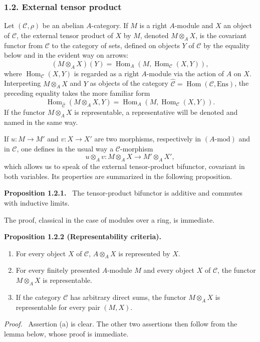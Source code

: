\documentclass[11pt]{article}
\newenvironment{statement}[1]{\par\medskip\noindent\textbf{#1.}\ }{\par\medskip}
\newenvironment{prooftext}[1][Proof]{\par\noindent\emph{#1.}\ }{\par\medskip}
\DeclareMathOperator{\Hom}{Hom}
\providecommand{\Hom}{\operatorname{Hom}}
\providecommand{\Ens}{\mathrm{Ens}}
\providecommand{\cC}{\mathcal C}
\providecommand{\Ens}{\operatorname{Ens}}
\begin{document}
\subsubsection*{1.2. External tensor product}
Let $(\cC,\rho)$ be an abelian $A$-category. If $M$ is a right $A$-module and $X$ an object of $\cC$, the external tensor product of $X$ by $M$, denoted $M\otimes_A X$, is the covariant functor from $\cC$ to the category of sets, defined on objects $Y$ of $\cC$ by the equality below and in the evident way on arrows:
\[
(M\otimes_A X)(Y)=\Hom_A(M,\Hom_{\cC}(X,Y)),
\]
where $\Hom_{\cC}(X,Y)$ is regarded as a right $A$-module via the action of $A$ on $X$. Interpreting $M\otimes_AX$ and $Y$ as objects of the category $\widehat{\cC}=\Hom(\cC,\Ens)$, the preceding equality takes the more familiar form
\[
\Hom_{\widehat{\cC}}(M\otimes_A X,Y)=\Hom_A(M,\Hom_{\cC}(X,Y)).
\]
If the functor $M\otimes_A X$ is representable, a representative will be denoted and named in the same way.

If $u:M\to M'$ and $v:X\to X'$ are two morphisms, respectively in $(A\text{-mod})$ and in $\cC$, one defines in the usual way a $\cC$-morphism
\[
u\otimes_A v:M\otimes_A X\longrightarrow M'\otimes_A X',
\]
which allows us to speak of the external tensor-product bifunctor, covariant in both variables. Its properties are summarized in the following proposition.

\begin{statement}{Proposition 1.2.1}
The tensor-product bifunctor is additive and commutes with inductive limits.
\end{statement}
The proof, classical in the case of modules over a ring, is immediate.

\begin{statement}{Proposition 1.2.2 (Representability criteria)}
\begin{enumerate}[label=(\alph*)]
\item For every object $X$ of $\cC$, $A\otimes_AX$ is represented by $X$.
\item For every finitely presented $A$-module $M$ and every object $X$ of $\cC$, the functor $M\otimes_AX$ is representable.
\item If the category $\cC$ has arbitrary direct sums, the functor $M\otimes_A X$ is representable for every pair $(M,X)$.
\end{enumerate}
\end{statement}

\begin{prooftext}[Proof]
Assertion (a) is clear. The other two assertions then follow from the lemma below, whose proof is immediate.
\end{prooftext}
\end{document}
